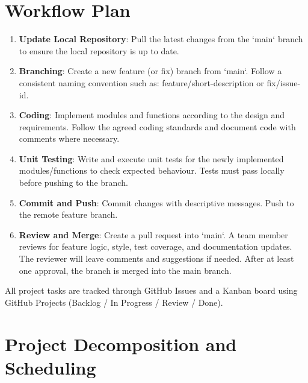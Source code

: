 \documentclass{article}
\begin{document}
\section{Workflow Plan}

\begin{enumerate}
  \item \textbf{Update Local Repository}: Pull the latest changes from the `main` branch to ensure the local repository is up to date.
  \item \textbf{Branching}: Create a new feature (or fix) branch from `main`. Follow a consistent naming convention such as: feature/short-description or fix/issue-id.
  \item \textbf{Coding}: Implement modules and functions according to the design and requirements. Follow the agreed coding standards and document code with comments where necessary.
  \item \textbf{Unit Testing}: Write and execute unit tests for the newly implemented modules/functions to check expected behaviour. Tests must pass locally before pushing to the branch.
  \item \textbf{Commit and Push}: Commit changes with descriptive messages. Push to the remote feature branch.
  \item \textbf{Review and Merge}: Create a pull request into `main`. A team member reviews for feature logic, style, test coverage, and documentation updates. The reviewer will leave comments and suggestions if needed. After at least one approval, the branch is merged into the main branch.
\end{enumerate}

All project tasks are tracked through GitHub Issues and a Kanban board using GitHub Projects (Backlog / In Progress / Review / Done).

\section{Project Decomposition and Scheduling}
\end{document}
